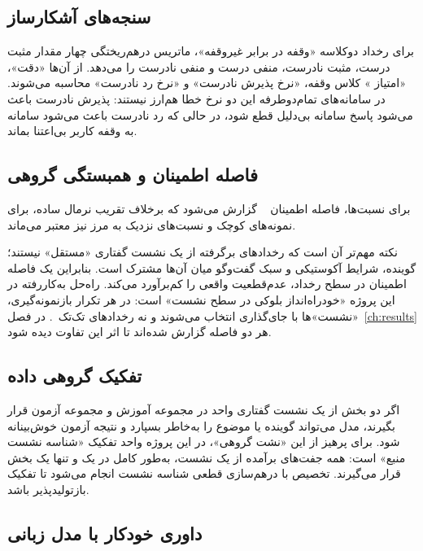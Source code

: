 \subsection{سنجه‌های آشکارساز}

برای رخداد دو‌کلاسه «وقفه در برابر غیر‌وقفه»، ماتریس درهم‌ریختگی چهار مقدار
مثبت درست، مثبت نادرست، منفی درست و منفی نادرست را می‌دهد. از آن‌ها
«دقت»، «امتیاز » کلاس وقفه،
«نرخ پذیرش نادرست» و
«نرخ رد نادرست» محاسبه می‌شوند. در
سامانه‌های تمام‌دوطرفه این دو نرخ خطا هم‌ارز نیستند: پذیرش نادرست باعث
می‌شود پاسخ سامانه بی‌دلیل قطع شود، در حالی که رد نادرست باعث می‌شود
سامانه به وقفه کاربر بی‌اعتنا بماند.

\subsection{فاصله اطمینان و همبستگی گروهی}

برای نسبت‌ها، فاصله اطمینان ~\cite{wilson1927interval} گزارش
می‌شود که برخلاف تقریب نرمال ساده، برای نمونه‌های کوچک و نسبت‌های نزدیک به
مرز نیز معتبر می‌ماند.

نکته مهم‌تر آن است که رخدادهای برگرفته از یک نشست گفتاری «مستقل»
نیستند؛ گوینده، شرایط آکوستیکی و سبک گفت‌وگو میان آن‌ها مشترک است. بنابراین
یک فاصله اطمینان در سطح رخداد، عدم‌قطعیت واقعی را کم‌برآورد می‌کند. راه‌حل
به‌کاررفته در این پروژه «خودراه‌انداز بلوکی در سطح نشست» است: در هر
تکرار بازنمونه‌گیری، «نشست»ها با جای‌گذاری انتخاب می‌شوند و نه
رخدادهای تک‌تک~\cite{efron1994bootstrap}. در فصل~\ref{ch:results} هر دو
فاصله گزارش شده‌اند تا اثر این تفاوت دیده شود.

\subsection{تفکیک گروهی داده}
\label{sec:group-split}

اگر دو بخش از یک نشست گفتاری واحد در مجموعه آموزش و مجموعه آزمون قرار
بگیرند، مدل می‌تواند گوینده یا موضوع را به‌خاطر بسپارد و نتیجه آزمون
خوش‌بینانه شود. برای پرهیز از این «نشت گروهی»، در این پروژه واحد تفکیک
«شناسه نشست منبع» است: همه جفت‌های برآمده از یک نشست، به‌طور کامل در
یک و تنها یک بخش قرار می‌گیرند. تخصیص با درهم‌سازی قطعی شناسه نشست انجام
می‌شود تا تفکیک بازتولیدپذیر باشد.

\subsection{داوری خودکار با مدل زبانی}
\label{sec:judge}

